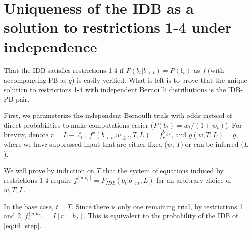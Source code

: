 \documentclass{article}
\begin{document}
\section{Uniqueness of the IDB as a solution to restrictions 1-4 under independence}

That the IDB satisfies restrictions 1-4 if $P(b_t|b_{<t}) = P(b_t)$ as $f$
(with accompanying PB as $g$) is easily verified. What is left is to prove that
the unique solution to restrictions 1-4 with independent Bernoulli
distributions is the IDB-PB pair.

First, we parameterize the independent Bernoulli trials with odds instead of
direct probabilities to make computations easier ($P(b_t) = w_t / (1 + w_t)$).
For brevity, denote $r = L - \ell_t$, $f^{x}(b_{<t},
w_{\leq t}, T, L) = f^{b_{\leq t}}_r$, and $g(w, T, L) = g$, where we have
suppressed input that are either fixed ($w$, $T$) or can be inferred ($L$).

We will prove by induction on $T$ that the system of equations induced by
restrictions 1-4 require $f^{[p, b_t]}_r = P_{IDB}(b_t|b_{<t}, L)$ for an
arbitrary choice of $w, T, L$.

In the base case, $t=T$. Since there is only one remaining trial, by
restrictions 1 and 2, $f^{[p, b_T]}_r = I[r = b_T]$. This is equivalent to
the probability of the IDB of \cref{eq:id_step}.
\end{document}
